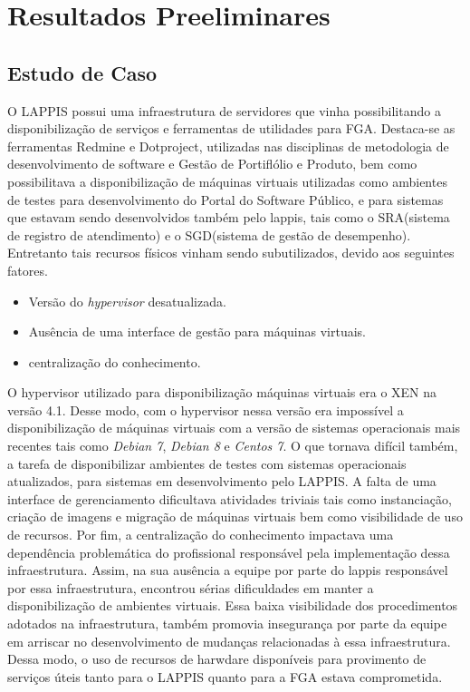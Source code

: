 \chapter{Resultados Preeliminares}
\label{cap:resultados}
\section{Estudo de Caso}
O LAPPIS possui uma infraestrutura de servidores que vinha possibilitando a disponibilização de serviços e ferramentas de utilidades para FGA. Destaca-se as ferramentas Redmine e Dotproject, utilizadas nas disciplinas de metodologia de desenvolvimento de software e Gestão de Portiflólio e Produto, bem como possibilitava a disponibilização de máquinas virtuais utilizadas como ambientes de testes para desenvolvimento do Portal do Software Público, e para sistemas que estavam sendo desenvolvidos também pelo  lappis, tais como o SRA(sistema de registro de atendimento) e o SGD(sistema de gestão de desempenho). Entretanto tais recursos físicos vinham sendo subutilizados, devido aos seguintes fatores.
\begin{itemize}
 \item Versão do \textit{hypervisor} desatualizada.
 \item Ausência de uma interface de gestão para máquinas virtuais.
 \item centralização do conhecimento.
\end{itemize}
      
      O hypervisor utilizado para disponibilização máquinas virtuais era o XEN na versão 4.1. Desse modo, com  o hypervisor nessa versão era impossível a disponibilização de máquinas virtuais com a versão de sistemas operacionais mais recentes tais como \textit{Debian 7}, \textit{Debian 8} e \textit{Centos 7}. O que tornava difícil também, a tarefa de disponibilizar ambientes de testes com sistemas operacionais atualizados, para sistemas em desenvolvimento pelo LAPPIS. A falta de uma interface de gerenciamento dificultava atividades triviais tais como instanciação, criação de imagens e migração de máquinas virtuais bem como visibilidade de uso de recursos. Por fim, a centralização do conhecimento impactava uma dependência problemática do profissional responsável pela implementação dessa infraestrutura. Assim, na sua ausência a equipe por parte do lappis responsável por essa infraestrutura, encontrou sérias dificuldades em manter a disponibilização de ambientes virtuais. Essa baixa visibilidade dos procedimentos adotados na infraestrutura, também promovia insegurança por parte da equipe em arriscar no desenvolvimento de mudanças relacionadas à essa infraestrutura. Dessa modo, o uso de recursos de harwdare disponíveis para provimento de serviços úteis tanto para o LAPPIS quanto para a FGA estava comprometida. 
      
